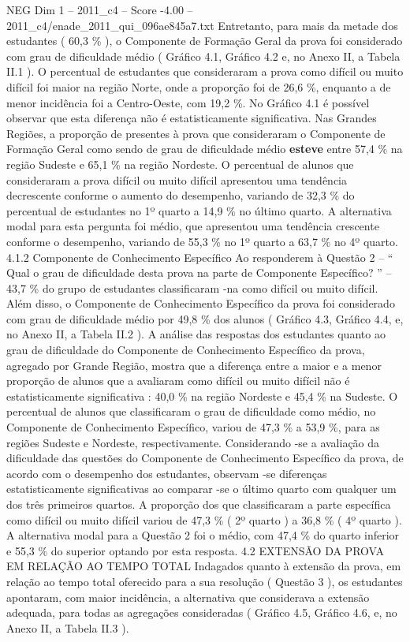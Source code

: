 \begin{textsample}{NEG Dim 1 – 2011\_c4 – Score -4.00 – 2011\_c4/enade\_2011\_qui\_096ae845a7.txt}
Entretanto, para mais da metade dos estudantes ( 60,3 \% ), o Componente de Formação Geral da prova foi considerado com grau de dificuldade médio ( Gráfico 4.1, Gráfico 4.2 e, no Anexo II, a Tabela II.1 ).
O percentual de estudantes que consideraram a prova como difícil ou muito difícil foi maior na região Norte, onde a proporção foi de 26,6 \%, enquanto a de menor incidência foi a Centro-Oeste, com 19,2 \%.
No Gráfico 4.1 é possível observar que esta diferença não é estatisticamente significativa.
Nas Grandes Regiões, a proporção de presentes à prova que consideraram o Componente de Formação Geral como sendo de grau de dificuldade médio \textbf{esteve} entre 57,4 \% na região Sudeste e 65,1 \% na região Nordeste.
O percentual de alunos que consideraram a prova difícil ou muito difícil apresentou uma tendência decrescente conforme o aumento do desempenho, variando de 32,3 \% do percentual de estudantes no 1º quarto a 14,9 \% no último quarto.
A alternativa modal para esta pergunta foi médio, que apresentou uma tendência crescente conforme o desempenho, variando de 55,3 \% no 1º quarto a 63,7 \% no 4º quarto. 4.1.2 Componente de Conhecimento Específico Ao responderem à Questão 2 – “ Qual o grau de dificuldade desta prova na parte de Componente Específico? ” – 43,7 \% do grupo de estudantes classificaram -na como difícil ou muito difícil.
Além disso, o Componente de Conhecimento Específico da prova foi considerado com grau de dificuldade médio por 49,8 \% dos alunos ( Gráfico 4.3, Gráfico 4.4, e, no Anexo II, a Tabela II.2 ).
A análise das respostas dos estudantes quanto ao grau de dificuldade do Componente de Conhecimento Específico da prova, agregado por Grande Região, mostra que a diferença entre a maior e a menor proporção de alunos que a avaliaram como difícil ou muito difícil não é estatisticamente significativa : 40,0 \% na região Nordeste e 45,4 \% na Sudeste.
O percentual de alunos que classificaram o grau de dificuldade como médio, no Componente de Conhecimento Específico, variou de 47,3 \% a 53,9 \%, para as regiões Sudeste e Nordeste, respectivamente.
Considerando -se a avaliação da dificuldade das questões do Componente de Conhecimento Específico da prova, de acordo com o desempenho dos estudantes, observam -se diferenças estatisticamente significativas ao comparar -se o último quarto com qualquer um dos três primeiros quartos.
A proporção dos que classificaram a parte específica como difícil ou muito difícil variou de 47,3 \% ( 2º quarto ) a 36,8 \% ( 4º quarto ).
A alternativa modal para a Questão 2 foi o médio, com 47,4 \% do quarto inferior e 55,3 \% do superior optando por esta resposta. 4.2 EXTENSÃO DA PROVA EM RELAÇÃO AO TEMPO TOTAL Indagados quanto à extensão da prova, em relação ao tempo total oferecido para a sua resolução ( Questão 3 ), os estudantes apontaram, com maior incidência, a alternativa que considerava a extensão adequada, para todas as agregações consideradas ( Gráfico 4.5, Gráfico 4.6, e, no Anexo II, a Tabela II.3 ).

\end{textsample}
